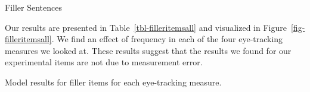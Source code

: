 \documentclass[
  12pt,
  letterpaper,
]{scrreport}
\begin{document}
\begin{exe}
\ex Filler Sentences \label{fillers}
\begin{xlist}
\end{xlist}
\end{exe}

Our results are presented in Table~\ref{tbl-filleritemsall} and
visualized in Figure~\ref{fig-filleritemsall}. We find an effect of
frequency in each of the four eye-tracking measures we looked at. These
results suggest that the results we found for our experimental items are
not due to measurement error.

\begin{table}

\caption{\label{tbl-filleritemsall}Model results for filler items for
each eye-tracking measure.}

\centering{

\centering\begingroup\fontsize{12}{14}\selectfont

}
\end{table}
\end{document}

